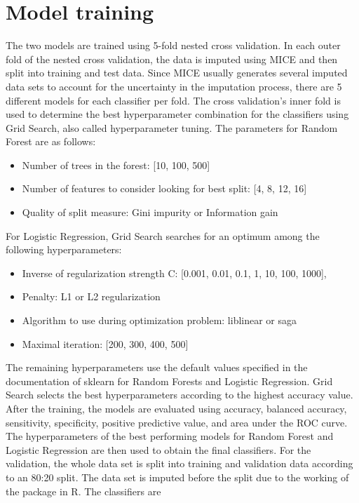 \section{Model training}
The two models are trained using 5-fold nested cross validation.
In each outer fold of the nested cross validation, the data is imputed using 
MICE and then split into training and test data. Since MICE usually generates 
several imputed data sets to account for the uncertainty in the imputation 
process, there are 5 different models for each classifier per fold. The cross 
validation's inner fold is used to determine the best hyperparameter 
combination for the classifiers using Grid Search, also called 
hyperparameter tuning. The parameters for Random Forest are as follows:
\begin{itemize}
 \item Number of trees in the forest: [10, 100, 500]
 \item Number of features to consider looking for best split: [4, 8, 12, 16]
 \item Quality of split measure: Gini impurity or Information gain
\end{itemize}
For Logistic Regression, Grid Search searches for an optimum among the 
following hyperparameters:
\begin{itemize}
 \item Inverse of regularization strength C: [0.001, 0.01, 0.1, 1, 10, 100, 
1000],
 \item Penalty: L1 or L2 regularization
 \item Algorithm to use during optimization problem: liblinear or saga
 \item Maximal iteration: [200, 300, 400, 500]
\end{itemize}
The remaining hyperparameters use the default values specified in the 
documentation of sklearn for Random Forests and Logistic Regression.
Grid Search selects the best hyperparameters according to the highest accuracy 
value.
\\
After the training, the models are evaluated using accuracy, balanced 
accuracy, sensitivity, 
specificity, positive predictive value, and area under the ROC curve.
The hyperparameters of the best performing models for Random Forest and 
Logistic Regression are then used to obtain the final classifiers.
For the validation, the whole data set is split into training and validation 
data according to an 80:20 split. The data set is imputed 
before the split 
due to the working of the  package in R. The classifiers are 
